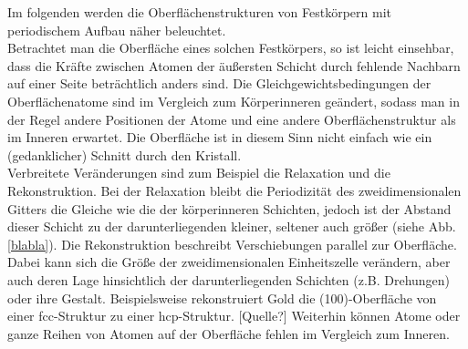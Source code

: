 Im folgenden werden die Oberflächenstrukturen von Festkörpern mit periodischem Aufbau näher
 beleuchtet. \\
 Betrachtet man die Oberfläche eines solchen Festkörpers, so ist leicht einsehbar, dass die
 Kräfte zwischen Atomen der äußersten Schicht durch fehlende Nachbarn auf einer Seite beträchtlich
 anders sind. Die Gleichgewichtsbedingungen der Oberflächenatome sind im Vergleich zum
 Körperinneren geändert, sodass man in der Regel andere Positionen der Atome und eine andere Oberflächenstruktur
 als im Inneren erwartet. Die Oberfläche ist in diesem Sinn nicht einfach wie ein (gedanklicher)
 Schnitt durch den Kristall.\\
 Verbreitete Veränderungen sind zum Beispiel die Relaxation und die Rekonstruktion. Bei der
 Relaxation bleibt die Periodizität des zweidimensionalen Gitters die Gleiche wie die der
 körperinneren Schichten, jedoch ist der Abstand dieser Schicht zu der
 darunterliegenden kleiner, seltener auch größer (siehe Abb. \ref{blabla}). Die Rekonstruktion
 beschreibt Verschiebungen parallel zur Oberfläche. Dabei kann sich die Größe der
 zweidimensionalen Einheitszelle verändern, aber auch deren Lage hinsichtlich der darunterliegenden
 Schichten (z.B. Drehungen) oder ihre Gestalt.  Beispielsweise rekonstruiert Gold die
 (100)-Oberfläche von einer fcc-Struktur zu einer hcp-Struktur. [Quelle?] Weiterhin können Atome
 oder ganze Reihen von Atomen auf der Oberfläche fehlen im Vergleich zum Inneren. 